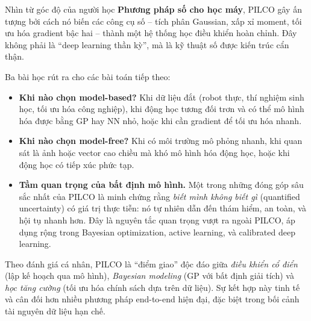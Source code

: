 Nhìn từ góc độ của người học \textbf{Phương pháp số cho học máy}, PILCO gây ấn tượng bởi cách nó biến các công cụ số -- tích phân Gaussian, xấp xỉ moment, tối ưu hóa gradient bậc hai -- thành một hệ thống học điều khiển hoàn chỉnh. Đây không phải là ``deep learning thần kỳ'', mà là kỹ thuật số được kiến trúc cẩn thận.

Ba bài học rút ra cho các bài toán tiếp theo:

\begin{itemize}
    \item \textbf{Khi nào chọn model-based?} Khi dữ liệu đắt (robot thực, thí nghiệm sinh học, tối ưu hóa công nghiệp), khi động học tương đối trơn và có thể mô hình hóa được bằng GP hay NN nhỏ, hoặc khi cần gradient để tối ưu hóa nhanh.
    \item \textbf{Khi nào chọn model-free?} Khi có môi trường mô phỏng nhanh, khi quan sát là ảnh hoặc vector cao chiều mà khó mô hình hóa động học, hoặc khi động học có tiếp xúc phức tạp.
    \item \textbf{Tầm quan trọng của bất định mô hình.} Một trong những đóng góp sâu sắc nhất của PILCO là minh chứng rằng \textit{biết mình không biết gì} (quantified uncertainty) có giá trị thực tiễn: nó tự nhiên dẫn đến thám hiểm, an toàn, và hội tụ nhanh hơn. Đây là nguyên tắc quan trọng vượt ra ngoài PILCO, áp dụng rộng trong Bayesian optimization, active learning, và calibrated deep learning.
\end{itemize}

Theo đánh giá cá nhân, PILCO là ``điểm giao'' độc đáo giữa \textit{điều khiển cổ điển} (lập kế hoạch qua mô hình), \textit{Bayesian modeling} (GP với bất định giải tích) và \textit{học tăng cường} (tối ưu hóa chính sách dựa trên dữ liệu). Sự kết hợp này tinh tế và cân đối hơn nhiều phương pháp end-to-end hiện đại, đặc biệt trong bối cảnh tài nguyên dữ liệu hạn chế.

